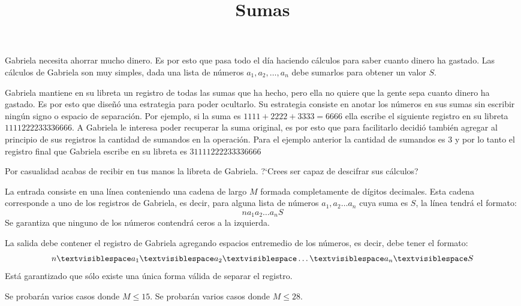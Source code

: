 \documentclass{oci}
\title{Sumas}
\begin{document}
\begin{problemDescription}
Gabriela necesita ahorrar mucho dinero.
Es por esto que pasa todo el día haciendo cálculos para saber cuanto dinero
ha gastado.
Las cálculos de Gabriela son muy simples, dada una lista de números $a_1, a_2,
\dots, a_n$ debe sumarlos para obtener un valor $S$.

Gabriela mantiene en su libreta un registro de todas las sumas que ha hecho,
pero ella no quiere que la gente sepa cuanto dinero ha gastado.
Es por esto que diseñó una estrategia para poder ocultarlo.
Su estrategia consiste en anotar los números en sus sumas sin escribir
ningún signo o espacio de separación.
Por ejemplo, si la suma es $1111+2222+3333=6666$ ella escribe el siguiente
registro en su libreta $1111222233336666$.
A Gabriela le interesa poder recuperar la suma original, es por esto que
para facilitarlo decidió también agregar al principio de sus registros la
cantidad de sumandos en la operación.
Para el ejemplo anterior la cantidad de sumandos es $3$ y por lo tanto el
registro final que Gabriela escribe en su libreta es $31111222233336666$

Por casualidad acabas de recibir en tus manos la libreta de Gabriela.
?`Crees ser capaz de descifrar sus cálculos?
\end{problemDescription}

\begin{inputDescription}
La entrada consiste en una línea conteniendo una cadena de largo $M$ formada
completamente de dígitos decimales.
Esta cadena corresponde a uno de los registros de Gabriela, es decir, para
alguna lista de números $a_1,a_2\dots a_n$ cuya suma es $S$, la línea tendrá el
formato:
$$n a_1 a_2 \dots a_nS$$
Se garantiza que ninguno de los números contendrá ceros a la izquierda.
\end{inputDescription}

\begin{outputDescription}
La salida debe contener el registro de Gabriela agregando espacios 
entremedio de los números, es decir, debe tener el formato:
$$n\textvisiblespace a_1\textvisiblespace a_2\textvisiblespace
\dots\textvisiblespace a_n\textvisiblespace S$$
Está garantizado que sólo existe una única forma válida de separar el registro.
\end{outputDescription}

\begin{scoreDescription}
   Se probarán varios casos donde $M\leq 15$.
   Se probarán varios casos donde $M\leq 28$.
\end{scoreDescription}

\begin{sampleDescription}
\end{sampleDescription}
\end{document}
